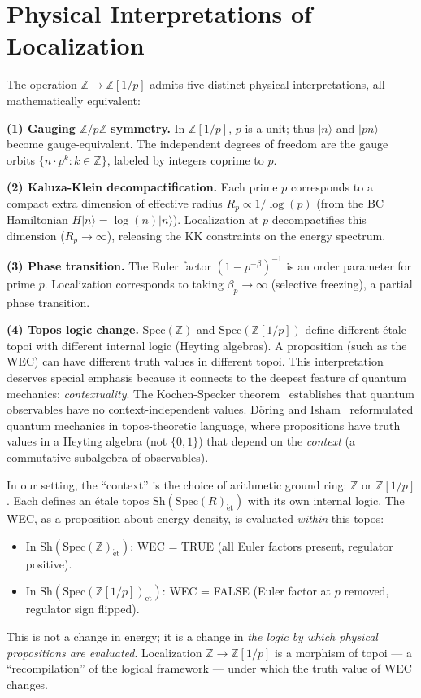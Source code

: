 \documentclass[aps,prd,twocolumn,superscriptaddress,nofootinbib]{revtex4-2}
\newcommand{\Spec}{\mathrm{Spec}}
\newcommand{\Zp}{\mathbb{Z}[1/p]}
\begin{document}
\section{Physical Interpretations of Localization}
\label{sec:physics}

The operation $\mathbb{Z} \to \Zp$ admits five distinct physical
interpretations, all mathematically equivalent:

\textbf{(1) Gauging $\mathbb{Z}/p\mathbb{Z}$ symmetry.}
In $\Zp$, $p$ is a unit; thus $|n\rangle$ and $|pn\rangle$ become
gauge-equivalent. The independent degrees of freedom are the
gauge orbits $\{n \cdot p^k : k \in \mathbb{Z}\}$, labeled by
integers coprime to $p$.

\textbf{(2) Kaluza-Klein decompactification.}
Each prime $p$ corresponds to a compact extra dimension of
effective radius $R_p \propto 1/\log(p)$ (from the BC Hamiltonian
$H|n\rangle = \log(n)|n\rangle$). Localization at $p$ decompactifies
this dimension ($R_p \to \infty$), releasing the KK constraints
on the energy spectrum.

\textbf{(3) Phase transition.}
The Euler factor $(1-p^{-\beta})^{-1}$ is an order parameter for
prime $p$. Localization corresponds to taking $\beta_p \to \infty$
(selective freezing), a partial phase transition.

\textbf{(4) Topos logic change.}
$\Spec(\mathbb{Z})$ and $\Spec(\Zp)$ define different
\'etale topoi with different internal logic (Heyting algebras).
A proposition (such as the WEC) can have different truth values
in different topoi.
This interpretation deserves special emphasis because it connects
to the deepest feature of quantum mechanics: \emph{contextuality}.
The Kochen-Specker theorem~\cite{KochenSpecker1967} establishes
that quantum observables have no context-independent values.
D\"oring and Isham~\cite{DoeringIsham2008} reformulated quantum
mechanics in topos-theoretic language, where propositions have
truth values in a Heyting algebra (not $\{0,1\}$) that depend
on the \emph{context} (a commutative subalgebra of observables).

In our setting, the ``context'' is the choice of arithmetic
ground ring: $\mathbb{Z}$ or $\Zp$. Each defines an \'etale
topos $\mathrm{Sh}(\Spec(R)_{\mathrm{\acute{e}t}})$ with its
own internal logic. The WEC, as a proposition about energy
density, is evaluated \emph{within} this topos:
\begin{itemize}
\item In $\mathrm{Sh}(\Spec(\mathbb{Z})_{\mathrm{\acute{e}t}})$:
  WEC = TRUE (all Euler factors present, regulator positive).
\item In $\mathrm{Sh}(\Spec(\Zp)_{\mathrm{\acute{e}t}})$:
  WEC = FALSE (Euler factor at $p$ removed, regulator sign flipped).
\end{itemize}
This is not a change in energy; it is a change in
\emph{the logic by which physical propositions are evaluated}.
Localization $\mathbb{Z} \to \Zp$ is a morphism of topoi ---
a ``recompilation'' of the logical framework --- under which
the truth value of WEC changes.
\end{document}
